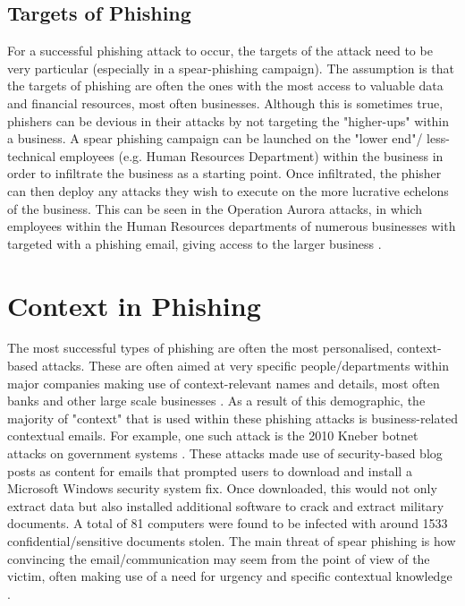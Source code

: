 \documentclass{l4proj}
\begin{document}
\subsection{Targets of Phishing}
For a successful phishing attack to occur, the targets of the attack need to be very particular (especially in a spear-phishing campaign). The assumption is that the targets of phishing are often the ones with the most access to valuable data and financial resources, most often businesses. Although this is sometimes true, phishers can be devious in their attacks by not targeting the "higher-ups" within a business. A spear phishing campaign can be launched on the "lower end"/ less-technical employees (e.g. Human Resources Department) within the business in order to infiltrate the business as a starting point. Once infiltrated, the phisher can then deploy any attacks they wish to execute on the more lucrative echelons of the business. This can be seen in the Operation Aurora attacks, in which employees within the Human Resources departments of numerous businesses with targeted with a phishing email, giving access to the larger business  \citep{bodmer2012reverse}.

\section{Context in Phishing}
The most successful types of phishing are often the most personalised, context-based attacks. These are often aimed at very specific people/departments within major companies making use of context-relevant names and details, most often banks and other large scale businesses \citep{tally2004anti}. As a result of this demographic, the majority of "context" that is used within these phishing attacks is business-related contextual emails. For example, one such attack is the 2010 Kneber botnet attacks on government systems \citep{villeneuve2010kneber}. These attacks made use of security-based blog posts as content for emails that prompted users to download and install a Microsoft Windows security system fix. Once downloaded, this would not only extract data but also installed additional software to crack and extract military documents. A total of 81 computers were found to be infected with around 1533 confidential/sensitive documents stolen. The main threat of spear phishing is how convincing the email/communication may seem from the point of view of the victim, often making use of a need for urgency and specific contextual knowledge \citep{nicho2018evaluating}.
\end{document}
